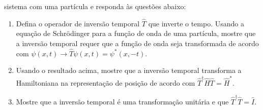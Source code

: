\begin{enumerate}
	      sistema com uma partícula e responda às questões abaixo:
	      \begin{enumerate}
		      \item Defina o operador de inversão temporal $\hat{T}$ que inverte o tempo.
		            Usando a equação de Schrödinger para a função de onda de uma partícula,
		            mostre que a inversão temporal requer que a
		            função de onda seja transformada de acordo com
		            $\psi(x,t)\rightarrow\hat{T}\psi(x,t)=\psi^*(x,-t)$.
		      \item Usando o resultado acima, mostre que a inversão temporal transforma
		            a Hamiltoniana na representação de posição de acordo com
		            $\hat{T}^\dagger\hat{H}\hat{T} = \hat{H}^*$.
		      \item Mostre que a inversão temporal é uma transformação unitária e que
		            $\hat{T}^\dagger\hat{T} = \hat{I}$.
	      \end{enumerate}
\end{enumerate}


